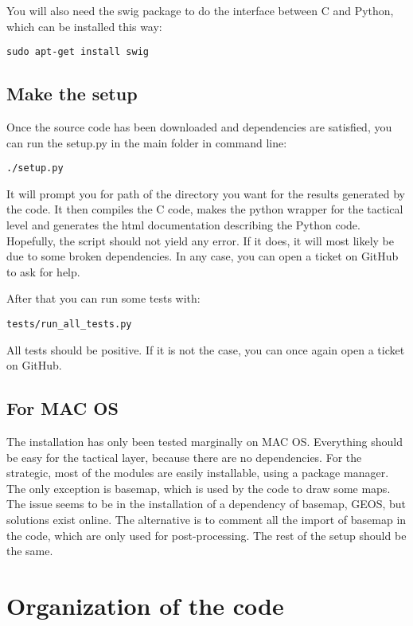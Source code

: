 \documentclass[12pt]{article}
\begin{document}
You will also need the swig package to do the interface between C and Python, which can be installed this way:
\begin{verbatim}
sudo apt-get install swig
\end{verbatim}

\subsection{Make the setup}

Once the source code has been downloaded and dependencies are satisfied, you can run the setup.py in the main folder in command line:

\begin{verbatim}
./setup.py
\end{verbatim}

It will prompt you for path of the directory you want for the results generated by the code. It then compiles the C code, makes the python wrapper for the tactical level and generates the html documentation describing the Python code. Hopefully, the script should not yield any error. If it does, it will most likely be due to some broken dependencies. In any case, you can open a ticket on GitHub to ask for help. 

After that you can run some tests with:
\begin{verbatim}
tests/run_all_tests.py
\end{verbatim}

All tests should be positive. If it is not the case, you can once again open a ticket on GitHub.

\subsection{For MAC OS}

The installation has only been tested marginally on MAC OS. Everything should be easy for the tactical layer, because there are no dependencies. For the strategic, most of the modules are easily installable, using a package manager. The only exception is basemap, which is used by the code to draw some maps. The issue seems to be in the installation of a dependency of basemap, GEOS, but solutions exist online. The alternative is to comment all the import of basemap in the code, which are only used for post-processing. The rest of the setup should be the same.

\section{Organization of the code}
\end{document}
